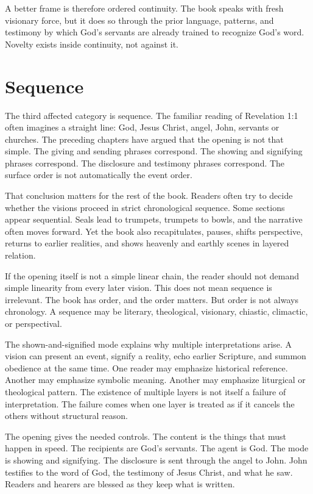A better frame is therefore ordered continuity. The book speaks with fresh visionary force, but it does so through the prior language, patterns, and testimony by which God's servants are already trained to recognize God's word. Novelty exists inside continuity, not against it.

\section{Sequence}

The third affected category is sequence. The familiar reading of Revelation 1:1 often imagines a straight line: God, Jesus Christ, angel, John, servants or churches. The preceding chapters have argued that the opening is not that simple. The giving and sending phrases correspond. The showing and signifying phrases correspond. The disclosure and testimony phrases correspond. The surface order is not automatically the event order.

That conclusion matters for the rest of the book. Readers often try to decide whether the visions proceed in strict chronological sequence. Some sections appear sequential. Seals lead to trumpets, trumpets to bowls, and the narrative often moves forward. Yet the book also recapitulates, pauses, shifts perspective, returns to earlier realities, and shows heavenly and earthly scenes in layered relation.

If the opening itself is not a simple linear chain, the reader should not demand simple linearity from every later vision. This does not mean sequence is irrelevant. The book has order, and the order matters. But order is not always chronology. A sequence may be literary, theological, visionary, chiastic, climactic, or perspectival.

The shown-and-signified mode explains why multiple interpretations arise. A vision can present an event, signify a reality, echo earlier Scripture, and summon obedience at the same time. One reader may emphasize historical reference. Another may emphasize symbolic meaning. Another may emphasize liturgical or theological pattern. The existence of multiple layers is not itself a failure of interpretation. The failure comes when one layer is treated as if it cancels the others without structural reason.

The opening gives the needed controls. The content is the things that must happen in speed. The recipients are God's servants. The agent is God. The mode is showing and signifying. The disclosure is sent through the angel to John. John testifies to the word of God, the testimony of Jesus Christ, and what he saw. Readers and hearers are blessed as they keep what is written.

